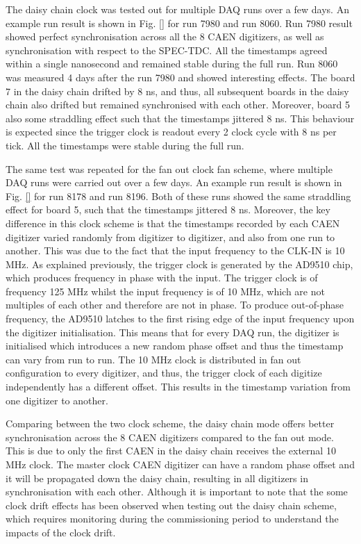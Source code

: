 The daisy chain clock was tested out for multiple DAQ runs over a few days. 
An example run result is shown in Fig. \ref{} for run 7980 and run 8060.
Run 7980 result showed perfect synchronisation across all the 8 CAEN digitizers, as well as synchronisation with respect to the SPEC-TDC.
All the timestamps agreed within a single nanosecond and remained stable during the full run.
Run 8060 was measured 4 days after the run 7980 and showed interesting effects.
The board 7 in the daisy chain drifted by 8 ns, and thus, all subsequent boards in the daisy chain also drifted but remained synchronised with each other. 
Moreover, board 5 also some straddling effect such that the timestamps jittered 8 ns.
This behaviour is expected since the trigger clock is readout every 2 clock cycle with 8 ns per tick.
All the timestamps were stable during the full run.

The same test was repeated for the fan out clock fan scheme, where multiple DAQ runs were carried out over a few days.
An example run result is shown in Fig. \ref{} for run 8178 and run 8196.
Both of these runs showed the same straddling effect for board 5, such that the timestamps jittered 8 ns.
Moreover, the key difference in this clock scheme is that the timestamps recorded by each CAEN digitizer varied randomly from digitizer to digitizer, and also from one run to another.
This was due to the fact that the input frequency to the CLK-IN is 10 MHz.
As explained previously, the trigger clock is generated by the AD9510 chip, which produces frequency in phase with the input.
The trigger clock is of frequency 125 MHz whilst the input frequency is of 10 MHz, which are not multiples of each other and therefore are not in phase.
To produce out-of-phase frequency, the AD9510 latches to the first rising edge of the input frequency upon the digitizer initialisation. 
This means that for every DAQ run, the digitizer is initialised which introduces a new random phase offset and thus the timestamp can vary from run to run.
The 10 MHz clock is distributed in fan out configuration to every digitizer, and thus, the trigger clock of each digitize independently has a different offset.
This results in the timestamp variation from one digitizer to another.

Comparing between the two clock scheme, the daisy chain mode offers better synchronisation across the 8 CAEN digitizers compared to the fan out mode.
This is due to only the first CAEN in the daisy chain receives the external 10 MHz clock.
The master clock CAEN digitizer can have a random phase offset and it will be propagated down the daisy chain, resulting in all digitizers in synchronisation with each other.
Although it is important to note that the some clock drift effects has been observed when testing out the daisy chain scheme, which requires monitoring during the commissioning period to understand the impacts of the clock drift.

